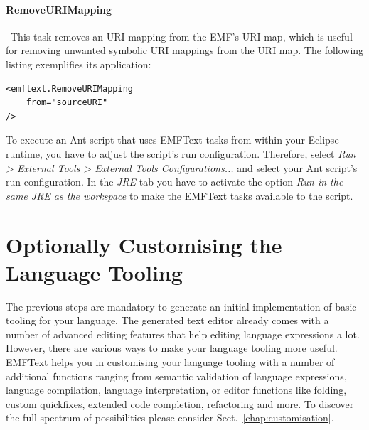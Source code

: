 \paragraph*{RemoveURIMapping}~This task removes an URI mapping from the EMF's
URI map, which is useful for removing unwanted symbolic URI mappings from the URI map. 
The following listing exemplifies its application: 
\begin{lstlisting}
<emftext.RemoveURIMapping
	from="sourceURI"
/>
\end{lstlisting}
	
	
	To execute an Ant script that uses EMFText tasks from within your Eclipse
	runtime, you have to adjust the script's run configuration. Therefore, select 
	\emph{Run > External Tools > External Tools Configurations...} and select 
	your Ant script's run configuration. In the \emph{JRE} tab you have to
	activate the option \emph{Run in the same JRE as the workspace} to make the
	EMFText tasks available to the script.
	
\section{Optionally Customising the Language Tooling}

The previous steps are mandatory to generate an initial implementation of
basic tooling for your language. The generated text editor already
comes with a number of advanced editing features that help editing language
expressions a lot. However, there are various ways to make your language tooling
more useful. EMFText helps you in customising your language tooling with a
number of additional functions ranging from semantic validation of language
expressions, language compilation, language interpretation, or editor functions
like folding, custom quickfixes, extended code completion, refactoring and more.
To discover the full spectrum of possibilities please consider 
Sect.~\ref{chap:customisation}.
